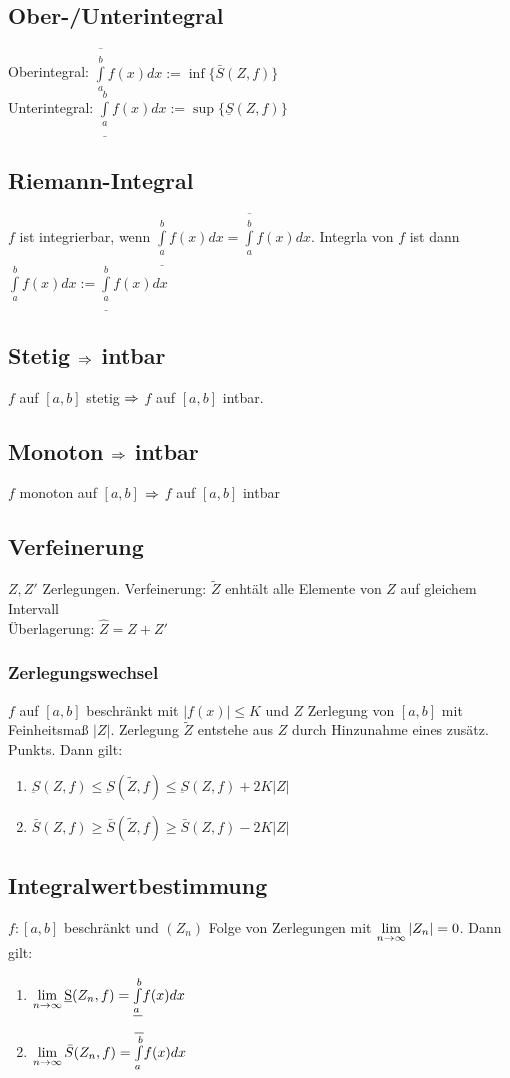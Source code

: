 \subsection*{Ober-/Unterintegral}
Oberintegral: $\overline{\int\limits_a^b} f(x) dx := \inf \{\bar S(Z, f)\}$\\
Unterintegral: $\underline{\int\limits_a^b}f(x) dx := \sup \{\underline{S}(Z, f)\}$
\subsection*{Riemann-Integral}
$f$ ist integrierbar, wenn $\underline{\int\limits_{a}^b} f(x) dx = \overline{\int\limits_a^b} f(x) dx$. Integrla von $f$ ist dann $\int\limits_a^b f(x) dx := \underline{\int\limits_a^b} f(x) dx$
\subsection*{Stetig \texorpdfstring{$\Rightarrow$}{folgt} intbar}
$f$ auf $[a, b]$ stetig $\Rightarrow$ $f$ auf $[a, b]$ intbar.
\subsection*{Monoton \texorpdfstring{$\Rightarrow$}{folgt} intbar}
$f$ monoton auf $[a, b]$ $\Rightarrow$ $f$ auf $[a, b]$ intbar
\subsection*{Verfeinerung}
$Z, Z'$ Zerlegungen.
Verfeinerung: $\tilde Z$ enhtält alle Elemente von $Z$ auf gleichem Intervall\\
Überlagerung: $\hat Z = Z + Z'$
\subsubsection*{Zerlegungswechsel}
$f$ auf $[a, b]$ beschränkt mit $|f(x)| \leq K$ und $Z$ Zerlegung von $[a, b]$ mit Feinheitsmaß $|Z|$. Zerlegung $\tilde Z$ entstehe aus $Z$ durch Hinzunahme eines zusätz. Punkts. Dann gilt:
\begin{enumerate}[label=\alph*., noitemsep]
    \item $\underbar S(Z, f) \leq \underbar S(\tilde Z, f) \leq \underbar S(Z, f) + 2K |Z|$
    \item $\bar S(Z, f) \geq \bar S(\tilde Z, f) \geq \bar S(Z, f) - 2K |Z|$
\end{enumerate}
\subsection*{Integralwertbestimmung}
$f:[a, b]$ beschränkt und $(Z_n)$ Folge von Zerlegungen mit $\lim\limits_{n \rightarrow \infty} |Z_n| = 0$. Dann gilt:
\begin{enumerate}[label=\alph*., noitemsep]
    \item $\lim\limits_{n \rightarrow \infty} \underbar S(Z_n, f) = \underline{ \int\limits_a^b} f(x) dx$
    \item $\lim\limits_{n \rightarrow \infty} \bar S(Z_n, f) = \overline{\int\limits_a^b} f(x) dx$
\end{enumerate}
